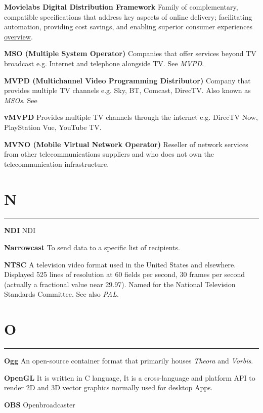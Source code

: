 \smallskip
\textbf{Movielabs Digital Distribution Framework}
Family of complementary, compatible specifications that address key aspects of online delivery; facilitating automation, providing cost savings, and enabling superior consumer experiences \href{https://movielabs.com/md/}{overview}.

\smallskip
\textbf{MSO (Multiple System Operator)}
Companies that offer services beyond TV broadcast e.g. Internet and telephone alongside TV.  See \textit{MVPD}.


\smallskip
\textbf{MVPD (Multichannel Video Programming Distributor)}
Company that provides multiple TV channels e.g. Sky, BT, Comcast, DirecTV. Also known as \textit{MSOs}. See

\smallskip
\textbf{vMVPD}
Provides multiple TV channels through the internet e.g. DirecTV Now, PlayStation Vue, YouTube TV.

\smallskip
\textbf{MVNO (Mobile Virtual Network Operator)}
Reseller of network services from other telecommunications suppliers and who does not own the telecommunication infrastructure.


\section{N}
\hrule

\medskip
\textbf{NDI}
NDI

\smallskip
\textbf{Narrowcast}
To send data to a specific list of recipients.

\smallskip
\textbf{NTSC}
A television video format used in the United States and elsewhere. Displayed 525 lines of resolution at 60 fields per second, 30 frames per second (actually a fractional value near 29.97). Named for the National Television Standards Committee. See also \textit{PAL}.


\section{O}
\hrule

\medskip
\textbf{Ogg}
An open-source container format that primarily houses \textit{Theora} and \textit{Vorbis}.

\smallskip
\textbf{OpenGL}
It is written in C language, It is a cross-language and platform API to render 2D and 3D vector graphics normally used for desktop Apps.

\smallskip
\textbf{OBS}
Openbroadcaster

